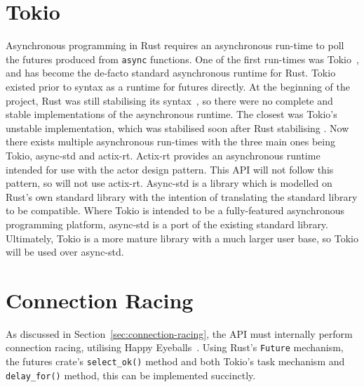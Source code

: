 \section{Tokio}\label{sec:tokio}
Asynchronous programming in Rust requires an asynchronous run-time to poll the futures produced from \texttt{async}
functions.
One of the first run-times was Tokio~\citep{tokiocommunity_tokioasynchronousruntime_}, and has become the de-facto standard
asynchronous runtime for Rust.
Tokio existed prior to \asyncawait{} syntax as a runtime for futures directly.
At the beginning of the project, Rust was still stabilising its \asyncawait{} syntax~\citep{withoutboats_asyncawaitnotation_},
so there were no complete and stable implementations of the asynchronous runtime.
The closest was Tokio's unstable implementation, which was stabilised soon after Rust stabilising
\asyncawait{}.
Now there exists multiple asynchronous run-times with the three main ones being Tokio, async-std and actix-rt.
Actix-rt provides an asynchronous runtime intended for use with the actor design pattern.
This API will not follow this pattern, so will not use actix-rt.
Async-std is a library which is modelled on Rust's own standard library with the intention of translating the standard
library to be \asyncawait{} compatible.
Where Tokio is intended to be a fully-featured asynchronous programming platform, async-std is a port of the existing
standard library.
Ultimately, Tokio is a more mature library with a much larger user base, so Tokio will be used over async-std.

\section{Connection Racing}\label{sec:connection-racing-impl}
As discussed in Section~\ref{sec:connection-racing}, the API must internally perform connection racing, utilising
Happy Eyeballs~\citep{pauly_happyeyeballsversion_}.
Using Rust's \texttt{Future} mechanism, the futures crate's \texttt{select\_ok()} method and both Tokio's task mechanism
and \texttt{delay\_for()} method, this can be implemented succinctly.

